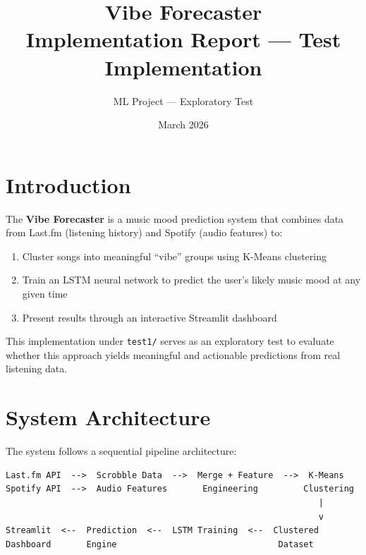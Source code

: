 \documentclass[12pt, a4paper]{article}
\title{\textbf{Vibe Forecaster} \\ \large Implementation Report — Test Implementation}
\author{ML Project — Exploratory Test}
\date{March 2026}
\begin{document}
\maketitle
\tableofcontents
\newpage

\section{Introduction}

The \textbf{Vibe Forecaster} is a music mood prediction system that combines data from Last.fm (listening history) and Spotify (audio features) to:

\begin{enumerate}
    \item Cluster songs into meaningful ``vibe'' groups using K-Means clustering
    \item Train an LSTM neural network to predict the user's likely music mood at any given time
    \item Present results through an interactive Streamlit dashboard
\end{enumerate}

This implementation under \texttt{test1/} serves as an exploratory test to evaluate whether this approach yields meaningful and actionable predictions from real listening data.

\section{System Architecture}

The system follows a sequential pipeline architecture:

\begin{verbatim}
Last.fm API  -->  Scrobble Data  -->  Merge + Feature  -->  K-Means
Spotify API  -->  Audio Features       Engineering         Clustering
                                                              |
                                                              v
Streamlit  <--  Prediction  <--  LSTM Training  <--  Clustered
Dashboard       Engine                                Dataset
\end{verbatim}
\end{document}
